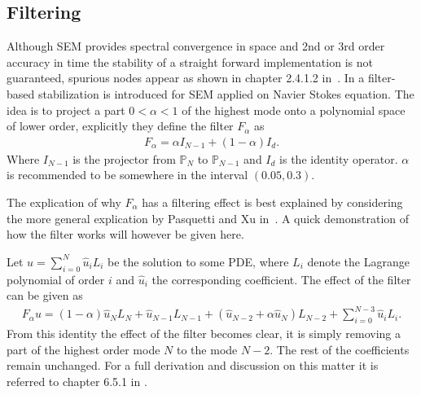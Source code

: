 \subsection{Filtering} \label{filtering}
Although SEM provides spectral convergence in space and 2nd or 3rd order accuracy in time the stability of a straight forward
implementation is not guaranteed, spurious nodes appear 
as shown in chapter 2.4.1.2 in~\cite{Karniadakis}.
In \cite{FischerMullen} a filter-based stabilization is introduced for SEM applied on 
Navier Stokes equation. The idea is to project a part $ 0 <\alpha < 1$ 
of the highest mode onto a polynomial space of lower order, 
explicitly they define the filter $F_{\alpha}$ as 
%
\begin{align}
    F_{\alpha}= \alpha I_{N-1}  + (1-\alpha) I_d.
    \label{eq:filter}
\end{align}
%
Where $I_{N-1}$ is the projector from $\mathbb{P}_N$ to $\mathbb{P}_{N-1}$ and $ I_d$ is the identity operator.
$\alpha$ is recommended to be somewhere in the interval $(0.05,0.3)$.

The explication of why $F_{\alpha}$ has a filtering effect is best explained by considering the 
more general explication by Pasquetti and Xu in~\cite{Pasquetti}. A quick demonstration of 
how the filter works will however be given here. 

Let $u = \sum_{i=0}^{N} \hat{u}_i L_i$ be the solution to some PDE, where $L_i$ denote the Lagrange
polynomial of order $i$ and $\hat{u}_i$ the corresponding coefficient. The effect of the filter
can be given as 
%
\begin{align}
    F_{\alpha} u = 
    (1-\alpha)\hat{u}_{N}L_{N}
    +\hat{u}_{N-1}L_{N-1} +
    (\hat{u}_{N-2}+\alpha \hat{u}_{N})L_{N-2}
    +\sum_{i=0}^{N-3}\hat{u}_{i}L_{i}.
    \label{eq:filtereffect}
\end{align}
%
From this identity the effect of the filter becomes clear, it is simply removing a part of 
the highest order mode $N$ to the mode $N-2$. The rest of the coefficients remain unchanged.
For a full derivation and discussion on this matter it is referred to chapter 6.5.1 in 
\cite{Karniadakis}.


